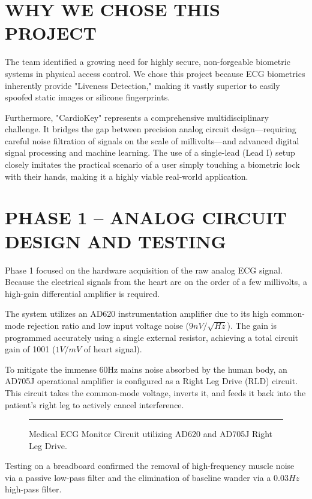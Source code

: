 \documentclass[12pt,a4paper]{report}
\begin{document}
\chapter{WHY WE CHOSE THIS PROJECT}
The team identified a growing need for highly secure, non-forgeable biometric systems in physical access control. We chose this project because ECG biometrics inherently provide "Liveness Detection," making it vastly superior to easily spoofed static images or silicone fingerprints. 

Furthermore, "CardioKey" represents a comprehensive multidisciplinary challenge. It bridges the gap between precision analog circuit design—requiring careful noise filtration of signals on the scale of millivolts—and advanced digital signal processing and machine learning. The use of a single-lead (Lead I) setup closely imitates the practical scenario of a user simply touching a biometric lock with their hands, making it a highly viable real-world application.

\chapter{PHASE 1 – ANALOG CIRCUIT DESIGN AND TESTING}
Phase 1 focused on the hardware acquisition of the raw analog ECG signal. Because the electrical signals from the heart are on the order of a few millivolts, a high-gain differential amplifier is required. 

The system utilizes an AD620 instrumentation amplifier due to its high common-mode rejection ratio and low input voltage noise ($9 nV/\sqrt{Hz}$). The gain is programmed accurately using a single external resistor, achieving a total circuit gain of 1001 ($1V/mV$ of heart signal).

To mitigate the immense 60Hz mains noise absorbed by the human body, an AD705J operational amplifier is configured as a Right Leg Drive (RLD) circuit. This circuit takes the common-mode voltage, inverts it, and feeds it back into the patient's right leg to actively cancel interference. 

\begin{figure}[htbp]
    \centering
    \rule{10cm}{6cm} %
    \caption{Medical ECG Monitor Circuit utilizing AD620 and AD705J Right Leg Drive.}
\end{figure}

Testing on a breadboard confirmed the removal of high-frequency muscle noise via a passive low-pass filter and the elimination of baseline wander via a $0.03Hz$ high-pass filter. 
\end{document}
